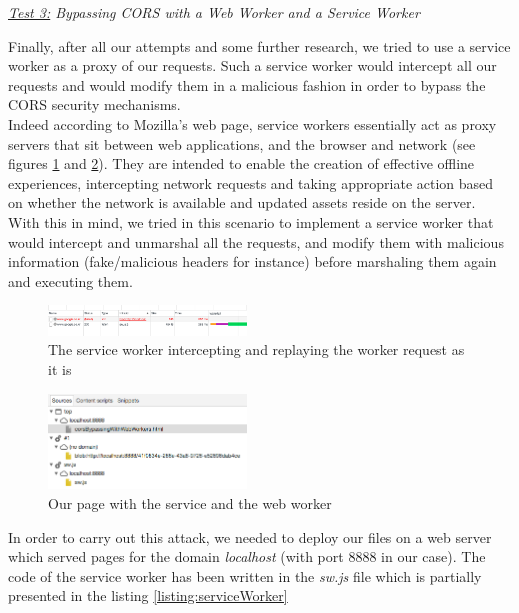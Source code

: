 \documentclass[journal]{IEEEtran}
\begin{document}
\medskip

\emph{\underline{Test 3:} Bypassing CORS with a Web Worker and a Service Worker}

Finally, after all our attempts and some further research, we tried to use a service worker as a proxy of our requests. Such a service worker would intercept all our requests and would modify them in a malicious fashion in order to bypass the CORS security mechanisms. \\
Indeed according to Mozilla's web page, service workers essentially act as proxy servers that sit between web applications, and the browser and network (see figures \ref{fig:corsWithServiceWorkers} and \ref{fig:serviceAndWebWorker}). They are intended to enable the creation of effective offline experiences, intercepting network requests and taking appropriate action based on whether the network is available and updated assets reside on the server. \\
With this in mind, we tried in this scenario to implement a service worker that would intercept and unmarshal all the requests, and modify them with malicious information (fake/malicious headers for instance) before marshaling them again and executing them.

\begin{figure}[h]
\centering
\includegraphics[width=0.47\textwidth]{images/corsWithServiceWorkers.png}
\caption{The service worker intercepting and replaying the worker request as it is}
\label{fig:corsWithServiceWorkers}
\end{figure}

\begin{figure}[h]
\centering
\includegraphics[width=0.47\textwidth]{images/serviceAndWebWorker.png}
\caption{Our page with the service and the web worker}
\label{fig:serviceAndWebWorker}
\end{figure}

In order to carry out this attack, we needed to deploy our files on a web server which served pages for the domain \emph{localhost} (with port 8888 in our case). The code of the service worker has been written in the \emph{sw.js} file which is partially presented in the listing \ref{listing:serviceWorker}
\end{document}
